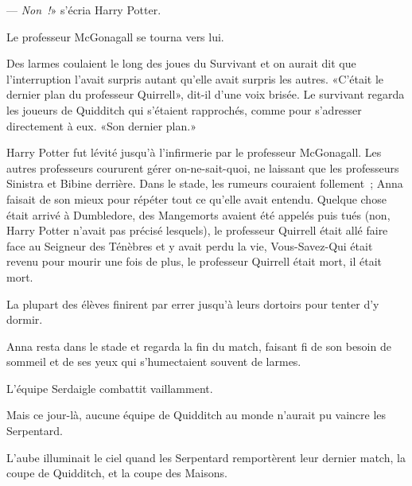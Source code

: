 --- \emph{Non~!}» s'écria Harry Potter.

Le professeur McGonagall se tourna vers lui.

Des larmes coulaient le long des joues du Survivant et on aurait dit que l'interruption l'avait surpris autant qu'elle avait surpris les autres. «C'était le dernier plan du professeur Quirrell», dit-il d'une voix brisée. Le survivant regarda les joueurs de Quidditch qui s'étaient rapprochés, comme pour s'adresser directement à eux. «Son dernier plan.»

Harry Potter fut lévité jusqu'à l'infirmerie par le professeur McGonagall. Les autres professeurs coururent gérer on-ne-sait-quoi, ne laissant que les professeurs Sinistra et Bibine derrière. Dans le stade, les rumeurs couraient follement~; Anna faisait de son mieux pour répéter tout ce qu'elle avait entendu. Quelque chose était arrivé à Dumbledore, des Mangemorts avaient été appelés puis tués (non, Harry Potter n'avait pas précisé lesquels), le professeur Quirrell était allé faire face au Seigneur des Ténèbres et y avait perdu la vie, Vous-Savez-Qui était revenu pour mourir une fois de plus, le professeur Quirrell était mort, il était mort.

La plupart des élèves finirent par errer jusqu'à leurs dortoirs pour tenter d'y dormir.

Anna resta dans le stade et regarda la fin du match, faisant fi de son besoin de sommeil et de ses yeux qui s'humectaient souvent de larmes.

L'équipe Serdaigle combattit vaillamment.

Mais ce jour-là, aucune équipe de Quidditch au monde n'aurait pu vaincre les Serpentard.

L'aube illuminait le ciel quand les Serpentard remportèrent leur dernier match, la coupe de Quidditch, et la coupe des Maisons. 


